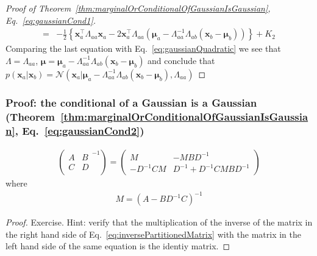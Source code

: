 \begin{frame}
\begin{proof}[Proof of Theorem~\ref{thm:marginalOrConditionalOfGaussianIsGaussian}, Eq.~\ref{eq:gaussianCond1}]
\begin{align*}
			                  =&-\frac{1}{2}\left\{\mathbf{x}_a^\intercal\Lambda_{aa}\mathbf{x}_a-2\mathbf{x}_a^\intercal\Lambda_{aa}(\boldsymbol{\mu}_a-\Lambda_{aa}^{-1}\Lambda_{ab}(\mathbf{x}_b-\boldsymbol{\mu}_b))\right\}+K_2
		\end{align*}
		Comparing the last equation with Eq.~\ref{eq:gaussianQuadratic} we see that $\Lambda=\Lambda_{aa}$, $\boldsymbol{\mu}=\boldsymbol{\mu}_a-\Lambda_{aa}^{-1}\Lambda_{ab}(\mathbf{x}_b-\boldsymbol{\mu}_b)$ and conclude that $p(\mathbf{x}_a|\mathbf{x}_b)=\mathcal{N}(\mathbf{x}_a|\boldsymbol{\mu}_a-\Lambda_{aa}^{-1}\Lambda_{ab}(\mathbf{x}_b-\boldsymbol{\mu}_b),\Lambda_{aa})$
		\normalsize
	\end{proof}
\end{frame}

\begin{frame}
    \frametitle{Proof: the conditional of a Gaussian is a Gaussian (Theorem~\ref{thm:marginalOrConditionalOfGaussianIsGaussian}, Eq.~\ref{eq:gaussianCond2})}

	\begin{claim}
		\begin{align}
			\left(\begin{array}{cc}
				      A & B\\
				      C & D
				  \end{array}^{-1}\right)=
			\left(\begin{array}{cc}
				      M         & -MBD^{-1}\\
					  -D^{-1}CM & D^{-1} + D^{-1}CMBD^{-1}
				  \end{array}\right)\label{eq:inversePartitionedMatrix}
		\end{align}
		where
		\begin{align*}
			M = (A - BD^{-1}C)^{-1}
		\end{align*}
	\end{claim}
	\begin{proof}
		\scriptsize
		Exercise. Hint: verify that the multiplication of the inverse of the matrix in the right hand side of Eq.~\ref{eq:inversePartitionedMatrix} with the matrix in the left hand side of the same equation is the identiy matrix.
		\phantom\qedhere
		\normalsize
	\end{proof}
\end{frame}

